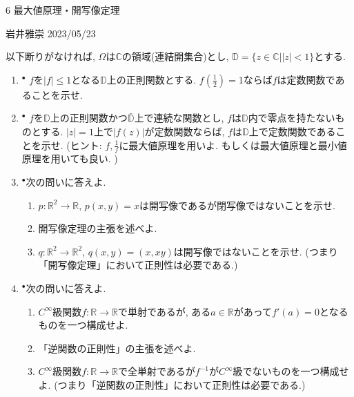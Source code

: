 \documentclass[dvipdfmx,a4paper,11pt]{article}
\newcommand{\R}{\mathbb{R}}
\newcommand{\C}{\mathbb{C}}
\newcommand{\D}{\mathbb{D}}
\theoremstyle{definition}
\begin{document}

\begin{center}
{\Large 6 最大値原理・開写像定理}
\end{center}

\begin{flushright}
 岩井雅崇 2023/05/23
\end{flushright}
以下断りがなければ, $\Omega$は$\C$の領域(連結開集合)とし, $\D=\{z \in \C |  |z| <1\}$とする. 


\begin{enumerate}[label=\textbf{問}6.\arabic*]

\item $^{\bullet}$ $f$を$|f| \le 1$となる$\D$上の正則関数とする. $f(\frac{1}{2})=1$ならば$f$は定数関数であることを示せ.

\item $^{\bullet}$ $f$を$\D$上の正則関数かつ$\bar{\D}$上で連続な関数とし, $f$は$\D$内で零点を持たないものとする. 
$|z|=1$上で$|f(z)|$が定数関数ならば, $f$は$\D$上で定数関数であることを示せ. (ヒント: $f, \frac{1}{f}$に最大値原理を用いよ. もしくは最大値原理と最小値原理を用いても良い. )

\item $^{\bullet}$次の問いに答えよ.
  \begin{enumerate}
\setlength{\parskip}{0cm} 
  \setlength{\itemsep}{0cm} 
\item  $p : \R^{2} \rightarrow \R$, $p(x,y)=x$は開写像であるが閉写像ではないことを示せ. 
\item 開写像定理の主張を述べよ.
\item $q : \R^{2} \rightarrow \R^2$, $q(x,y)=(x,xy)$は開写像ではないことを示せ.  (つまり「開写像定理」において正則性は必要である.)
    \end{enumerate}  
   

\item $^{\bullet}$次の問いに答えよ.
  \begin{enumerate}
\setlength{\parskip}{0cm} 
  \setlength{\itemsep}{0cm} 
  \item $C^{\infty}$級関数$f : \R \rightarrow \R$で単射であるが, ある$a \in \R$があって$f'(a)=0$となるものを一つ構成せよ.
   \item 「逆関数の正則性」の主張を述べよ.
\item $C^\infty$級関数$f : \R \rightarrow \R$で全単射であるが$f^{-1}$が$C^{\infty}$級でないものを一つ構成せよ. (つまり「逆関数の正則性」において正則性は必要である.)
   \end{enumerate}  
   

\end{enumerate}
\end{document}
